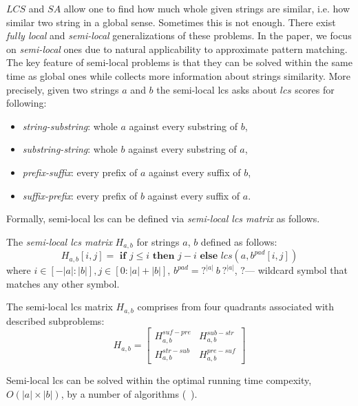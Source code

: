 $LCS$ and $SA$ allow one to find how much whole given strings are similar, i.e. how similar two string in a global sense.
Sometimes this is not enough.
There exist \emph{fully local} and \emph{semi-local} generalizations of these problems.
In the paper, we focus on \emph{semi-local} ones due to natural applicability to approximate pattern matching.
The key feature of semi-local problems is that they can be solved within the same time as global ones while collects more information about strings similarity.
More precisely, given two strings $a$ and $b$ the semi-local lcs asks about $lcs$ scores for following:
\begin{itemize}
\item \emph{string-substring}: whole $a$ against every substring of $b$,
\item \emph{substring-string}: whole $b$ against every substring of $a$,
\item \emph{prefix-suffix}: every prefix of $a$ against every suffix of $b$,
\item \emph{suffix-prefix}: every prefix of $b$ against every suffix of $a$.
\end{itemize} 
Formally, semi-local lcs can be defined via \emph{semi-local lcs matrix} as follows.
\begin{definition}
The \emph{semi-local lcs matrix}  $H_{a,b}$ for strings $a$, $b$ defined as follows:
\begin{equation}
  H_{a,b}[i,j] = \textbf{ if } j\leq i \textbf{ then } j-i \textbf{ else } lcs(a,b^{pad}[i,j]) 
\end{equation} 
where $i \in [-|a|:|b|], j \in [0:|a|+|b|] $, $b^{pad}= ?^{|a|}\ b\ ?^{|a|}$, $?$--- wildcard symbol that matches any other symbol.
\end{definition}
The semi-local lcs matrix $H_{a,b}$ comprises from four quadrants associated with described subproblems:
\begin{equation}
  H_{a,b} = \begin{bmatrix}
    H_{a,b}^{suf-pre} & H_{a,b}^{sub-str} \\
    H_{a,b}^{str-sub} & H_{a,b}^{pre-suf} 
  \end{bmatrix}    
\end{equation}

Semi-local lcs can be solved within the optimal running time compexity, $O(|a| \times |b|)$, by a number of algorithms (~\cite{.}).


